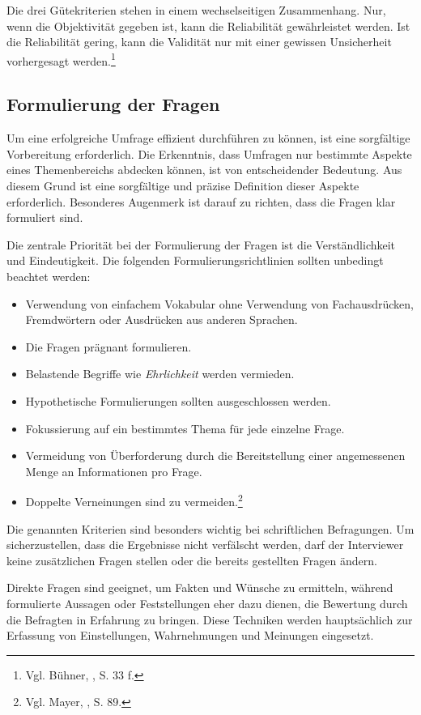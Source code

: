 Die drei Gütekriterien stehen in einem wechselseitigen Zusammenhang. Nur, wenn die Objektivität gegeben ist, kann die
Reliabilität gewährleistet werden. Ist die Reliabilität gering, kann die Validität nur mit einer gewissen Unsicherheit
vorhergesagt werden.\footnote{Vgl. Bühner, \cite{Einfuehrung in die Test- und Fragebogenkonstruktion}, S. 33 f.}

\subsection{Formulierung der Fragen}
Um eine erfolgreiche Umfrage effizient durchführen zu können, ist eine sorgfältige Vorbereitung erforderlich. Die
Erkenntnis, dass Umfragen nur bestimmte Aspekte eines Themenbereichs abdecken können, ist von entscheidender Bedeutung.
Aus diesem Grund ist eine sorgfältige und präzise Definition dieser Aspekte erforderlich. Besonderes Augenmerk ist darauf
zu richten, dass die Fragen klar formuliert sind.

Die zentrale Priorität bei der Formulierung der Fragen ist die Verständlichkeit und Eindeutigkeit. Die folgenden
Formulierungsrichtlinien sollten unbedingt beachtet werden:
\begin{itemize}
    \item Verwendung von einfachem Vokabular ohne Verwendung von Fachausdrücken, Fremdwörtern oder Ausdrücken aus anderen Sprachen.
    \item Die Fragen prägnant formulieren.
    \item Belastende Begriffe wie \textit{Ehrlichkeit} werden vermieden.
    \item Hypothetische Formulierungen sollten ausgeschlossen werden.
    \item Fokussierung auf ein bestimmtes Thema für jede einzelne Frage.
    \item Vermeidung von Überforderung durch die Bereitstellung einer angemessenen Menge an Informationen pro Frage.
    \item Doppelte Verneinungen sind zu vermeiden.\footnote{Vgl. Mayer, \cite{Interview und schriftliche Befragung}, S. 89.}\\
\end{itemize}

Die genannten Kriterien sind besonders wichtig bei schriftlichen Befragungen. Um sicherzustellen, dass die Ergebnisse nicht
verfälscht werden, darf der Interviewer keine zusätzlichen Fragen stellen oder die bereits gestellten Fragen ändern.

Direkte Fragen sind geeignet, um Fakten und Wünsche zu ermitteln, während formulierte Aussagen oder Feststellungen eher
dazu dienen, die Bewertung durch die Befragten in Erfahrung zu bringen. Diese Techniken werden hauptsächlich zur Erfassung
von Einstellungen, Wahrnehmungen und Meinungen eingesetzt.

